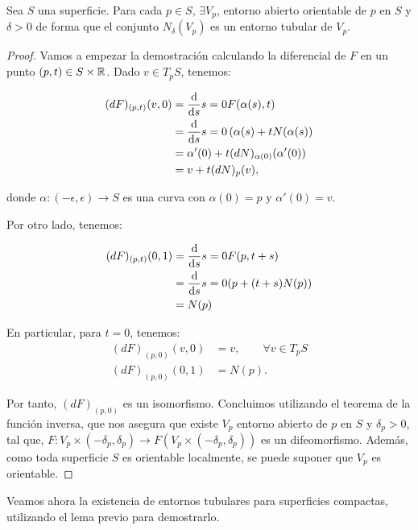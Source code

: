 \begin{lemma}
Sea $S$ una superficie. Para cada $p \in S$, $\exists V_p$, entorno abierto orientable de $p$ en $S$ y $\delta > 0$ de forma que el conjunto $N_\delta(V_p)$ es un entorno tubular de $V_p$.
\end{lemma}
\begin{proof}
Vamos a empezar la demostración calculando la diferencial de $F$ en un punto $(p,t) \in S \times \mathbb{R}$. Dado $v \in T_pS$, tenemos:

\begin{align*}
    (dF)_{(p,t)}(v,0) &= \diff{}{s}{s=0} F(\alpha(s), t) \\
    &= \diff{}{s}{s=0} \left( \alpha(s) + tN(\alpha(s) \right) \\ 
    &= \alpha'(0) + t(dN)_{\alpha(0)}(\alpha'(0)) \\ 
    &= v + t(dN)_p(v),
\end{align*}

donde $\alpha: (-\epsilon, \epsilon) \longrightarrow S$ es una curva con $\alpha(0) = p$ y $\alpha'(0) = v$. 

Por otro lado, tenemos:

\begin{align*}
    (dF)_{(p,t)}(0,1) &= \diff{}{s}{s=0} F(p, t+s) \\ 
    &= \diff{}{s}{s=0} (p + (t+s)N(p)) \\ &= N(p)
\end{align*}

En particular, para $t=0$, tenemos:
%
\begin{align*}
    (dF)_{(p,0)}(v,0) &= v, \qquad \forall v \in T_pS \\
    (dF)_{(p,0)}(0,1) &= N(p).
\end{align*}

Por tanto, $(dF)_{(p,0)}$ es un isomorfismo. Concluimos utilizando el teorema de la función inversa, que nos asegura que existe $V_p$ entorno abierto de $p$ en $S$ y $\delta_p > 0$, tal que, $F: V_p \times (-\delta_p, \delta_p) \longrightarrow F(V_p \times (-\delta_p, \delta_p))$ es un difeomorfismo. Además, como toda superficie $S$ es orientable localmente, se puede suponer que $V_p$ es orientable.
\end{proof}

Veamos ahora la existencia de entornos tubulares para superficies compactas, utilizando el lema previo para demostrarlo.

